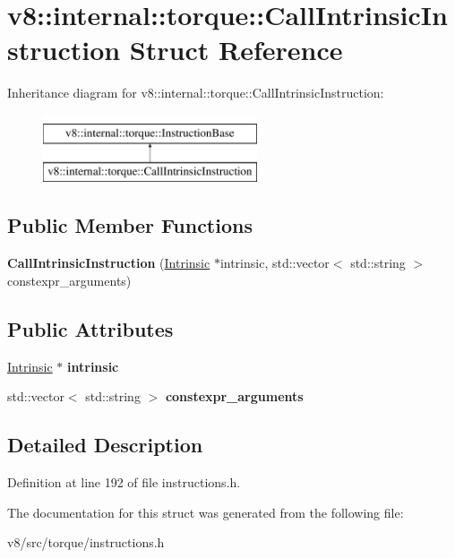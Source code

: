 \hypertarget{structv8_1_1internal_1_1torque_1_1CallIntrinsicInstruction}{}\section{v8\+:\+:internal\+:\+:torque\+:\+:Call\+Intrinsic\+Instruction Struct Reference}
\label{structv8_1_1internal_1_1torque_1_1CallIntrinsicInstruction}
Inheritance diagram for v8\+:\+:internal\+:\+:torque\+:\+:Call\+Intrinsic\+Instruction\+:\begin{figure}[H]
\begin{center}
\leavevmode
\includegraphics[height=2.000000cm]{structv8_1_1internal_1_1torque_1_1CallIntrinsicInstruction}
\end{center}
\end{figure}
\subsection*{Public Member Functions}
\begin{DoxyCompactItemize}
\item 
\mbox{\label{structv8_1_1internal_1_1torque_1_1CallIntrinsicInstruction_aa459cf67f4b0d69df91a84c9d46df835}} 
{\bfseries Call\+Intrinsic\+Instruction} (\mbox{\hyperlink{classv8_1_1internal_1_1torque_1_1Intrinsic}{Intrinsic}} $\ast$intrinsic, std\+::vector$<$ std\+::string $>$ constexpr\+\_\+arguments)
\end{DoxyCompactItemize}
\subsection*{Public Attributes}
\begin{DoxyCompactItemize}
\item 
\mbox{\label{structv8_1_1internal_1_1torque_1_1CallIntrinsicInstruction_a625109353fb41f0fe40ad779a69a45e4}} 
\mbox{\hyperlink{classv8_1_1internal_1_1torque_1_1Intrinsic}{Intrinsic}} $\ast$ {\bfseries intrinsic}
\item 
\mbox{\label{structv8_1_1internal_1_1torque_1_1CallIntrinsicInstruction_a8c0005b08266df5436d4edec4d8aaa90}} 
std\+::vector$<$ std\+::string $>$ {\bfseries constexpr\+\_\+arguments}
\end{DoxyCompactItemize}


\subsection{Detailed Description}


Definition at line 192 of file instructions.\+h.



The documentation for this struct was generated from the following file\+:\begin{DoxyCompactItemize}
\item 
v8/src/torque/instructions.\+h\end{DoxyCompactItemize}
